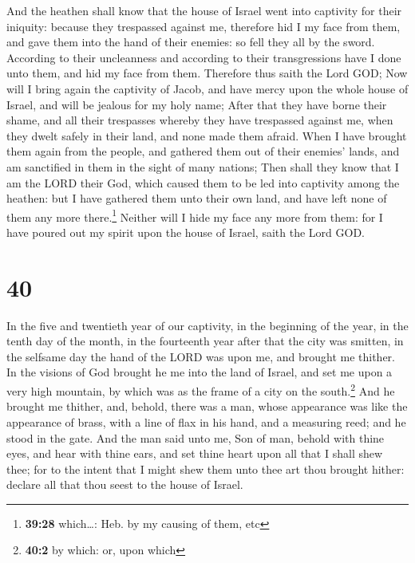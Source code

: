  And the heathen shall know that the house of Israel went
into captivity for their iniquity: because they trespassed against me,
therefore hid I my face from them, and gave them into the hand of their
enemies: so fell they all by the sword.  According to
their uncleanness and according to their transgressions have I done unto
them, and hid my face from them.  Therefore thus saith
the Lord GOD; Now will I bring again the captivity of Jacob, and have
mercy upon the whole house of Israel, and will be jealous for my holy
name;  After that they have borne their shame, and all
their trespasses whereby they have trespassed against me, when they
dwelt safely in their land, and none made them afraid. 
When I have brought them again from the people, and gathered them out of
their enemies' lands, and am sanctified in them in the sight of many
nations;  Then shall they know that I am the LORD their
God, which caused them to be led into captivity among the heathen: but I
have gathered them unto their own land, and have left none of them any
more there.\footnote{\textbf{39:28} which\ldots: Heb. by my causing of
  them, etc}  Neither will I hide my face any more from
them: for I have poured out my spirit upon the house of Israel, saith
the Lord GOD.

\hypertarget{section-39}{%
\section{40}\label{section-39}}

 In the five and twentieth year of our captivity, in the
beginning of the year, in the tenth day of the month, in the fourteenth
year after that the city was smitten, in the selfsame day the hand of
the LORD was upon me, and brought me thither.  In the
visions of God brought he me into the land of Israel, and set me upon a
very high mountain, by which was as the frame of a city on the
south.\footnote{\textbf{40:2} by which: or, upon which} 
And he brought me thither, and, behold, there was a man, whose
appearance was like the appearance of brass, with a line of flax in his
hand, and a measuring reed; and he stood in the gate.  And
the man said unto me, Son of man, behold with thine eyes, and hear with
thine ears, and set thine heart upon all that I shall shew thee; for to
the intent that I might shew them unto thee art thou brought hither:
declare all that thou seest to the house of Israel.

